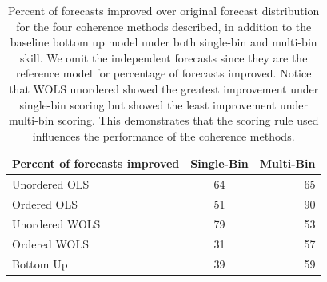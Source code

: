 \documentclass{umassthesis}          %
\begin{document}
\begin{table}
\begin{center}
  \begin{tabular}{ | l | c | r |  }
    \hline
   \textbf{Percent of forecasts improved} & \textbf{Single-Bin} & \textbf{Multi-Bin}  \\ \hline
    Unordered OLS & 64 &  65 \\ \hline
    Ordered OLS  &51 & 90  \\ \hline
    Unordered WOLS & 79 & 53   \\ \hline
     Ordered WOLS &  31 & 57  \\ \hline
     Bottom Up  & 39 &  59  \\ \hline
  \end{tabular}
  \end{center}

  \caption{Percent of forecasts improved over original forecast distribution for the four coherence methods described, in addition to the baseline bottom up model under both single-bin and multi-bin skill. We omit the independent forecasts since they are the reference model for percentage of forecasts improved. Notice that WOLS unordered showed the greatest improvement under single-bin scoring but showed the least improvement under multi-bin scoring. This demonstrates that the scoring rule used influences the performance of the coherence methods.  }
\end{table}
\end{document}
